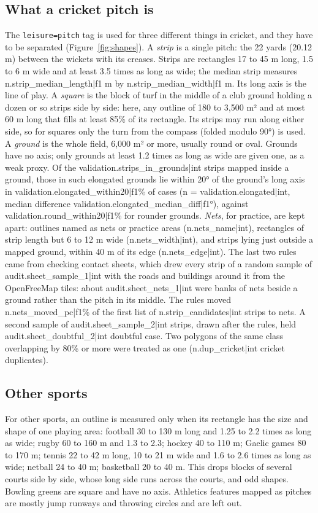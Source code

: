 \documentclass[11pt,a4paper]{article}
\begin{document}
\subsection{What a cricket pitch is}
The \texttt{leisure=pitch} tag is used for three different things in cricket, and they have to be separated (Figure~\ref{fig:shapes}).
A \emph{strip} is a single pitch: the 22 yards (20.12 m) between the wickets with its creases. Strips are rectangles 17 to 45 m long, 1.5 to 6 m wide and at least 3.5 times as long as wide; the median strip measures {{n.strip_median_length|f1}} m by {{n.strip_median_width|f1}} m. Its long axis is the line of play.
A \emph{square} is the block of turf in the middle of a club ground holding a dozen or so strips side by side: here, any outline of 180 to 3,500 m² and at most 60 m long that fills at least 85\% of its rectangle. Its strips may run along either side, so for squares only the turn from the compass (folded modulo 90°) is used.
A \emph{ground} is the whole field, 6,000 m² or more, usually round or oval. Grounds have no axis; only grounds at least 1.2 times as long as wide are given one, as a weak proxy. Of the {{validation.strips_in_grounds|int}} strips mapped inside a ground, those in such elongated grounds lie within 20° of the ground's long axis in {{validation.elongated_within20|f1}}\% of cases (n = {{validation.elongated|int}}, median difference {{validation.elongated_median_diff|f1}}°), against {{validation.round_within20|f1}}\% for rounder grounds.
\emph{Nets}, for practice, are kept apart: outlines named as nets or practice areas ({{n.nets_name|int}}), rectangles of strip length but 6 to 12 m wide ({{n.nets_width|int}}), and strips lying just outside a mapped ground, within 40 m of its edge ({{n.nets_edge|int}}). The last two rules came from checking contact sheets, which drew every strip of a random sample of {{audit.sheet_sample_1|int}} with the roads and buildings around it from the OpenFreeMap tiles: about {{audit.sheet_nets_1|int}} were banks of nets beside a ground rather than the pitch in its middle. The rules moved {{n.nets_moved_pc|f1}}\% of the first list of {{n.strip_candidates|int}} strips to nets. A second sample of {{audit.sheet_sample_2|int}} strips, drawn after the rules, held {{audit.sheet_doubtful_2|int}} doubtful case. Two polygons of the same class overlapping by 80\% or more were treated as one ({{n.dup_cricket|int}} cricket duplicates).

\subsection{Other sports}
For other sports, an outline is measured only when its rectangle has the size and shape of one playing area: football 30 to 130 m long and 1.25 to 2.2 times as long as wide; rugby 60 to 160 m and 1.3 to 2.3; hockey 40 to 110 m; Gaelic games 80 to 170 m; tennis 22 to 42 m long, 10 to 21 m wide and 1.6 to 2.6 times as long as wide; netball 24 to 40 m; basketball 20 to 40 m. This drops blocks of several courts side by side, whose long side runs across the courts, and odd shapes. Bowling greens are square and have no axis. Athletics features mapped as pitches are mostly jump runways and throwing circles and are left out.
\end{document}
